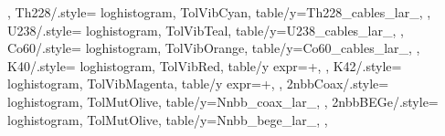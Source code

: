 {{  },
  Th228/.style={%
    loghistogram,
    TolVibCyan,
    table/y=Th228_cables_lar_\dataset,
  },
  U238/.style={%
    loghistogram,
    TolVibTeal,
    table/y=U238_cables_lar_\dataset,
  },
  Co60/.style={%
    loghistogram,
    TolVibOrange,
    table/y=Co60_cables_lar_\dataset,
  },
  K40/.style={%
    loghistogram,
    TolVibRed,
    table/y expr=+,
  },
  K42/.style={%
    loghistogram,
    TolVibMagenta,
    table/y expr=+,
  },
  2nbbCoax/.style={%
    loghistogram,
    TolMutOlive,
    table/y=Nnbb_coax_lar_\dataset,
  },
  2nbbBEGe/.style={%
    loghistogram,
    TolMutOlive,
    table/y=Nnbb_bege_lar_\dataset,
  },
}

\newcommand{\addbrasilianplot}{%
  \addplot[3sigu] table {\loadedtable};
  \addplot[3sigl] table {\loadedtable};
  \addplot[3sigb] fill between [of=3sigu and 3sigl];
  \addplot[2sigu] table {\loadedtable};
  \addplot[2sigl] table {\loadedtable};
  \addplot[2sigb] fill between [of=2sigu and 2sigl];
  \addplot[1sigu] table {\loadedtable};
  \addplot[1sigl] table {\loadedtable};
  \addplot[1sigb] fill between [of=1sigu and 1sigl];
  \addplot[ratio] table {\loadedtable};
}

\newcommand{\dataset}{M1_enrBEGe}
